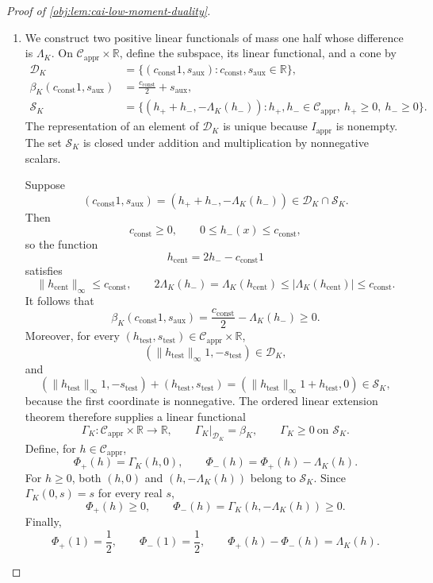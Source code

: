 \begin{proof}[Proof of \cref{obj:lem:cai-low-moment-duality}]
\begin{enumerate}
\item We construct two positive linear functionals of mass one half whose difference is \(\Lambda_K\). On
\(\mathcal C_{\mathrm{appr}}\times\mathbb R\), define the subspace, its linear functional, and a cone by
\[
\begin{aligned}
\mathcal D_K
&=\{(c_{\mathrm{const}}1,s_{\mathrm{aux}}):
       c_{\mathrm{const}},s_{\mathrm{aux}}\in\mathbb R\},\\
\beta_K(c_{\mathrm{const}}1,s_{\mathrm{aux}})
&=\frac{c_{\mathrm{const}}}{2}+s_{\mathrm{aux}},\\
\mathcal S_K
&=\{(h_++h_-,-\Lambda_K(h_-)):
       h_+,h_-\in\mathcal C_{\mathrm{appr}},\
       h_+\ge0,\ h_-\ge0\}.
\end{aligned}
\]
The representation of an element of \(\mathcal D_K\) is unique because
\(I_{\mathrm{appr}}\) is nonempty. The set \(\mathcal S_K\) is closed under addition and multiplication by nonnegative scalars.

Suppose
\[
(c_{\mathrm{const}}1,s_{\mathrm{aux}})
=(h_++h_-,-\Lambda_K(h_-))\in\mathcal D_K\cap\mathcal S_K.
\]
Then
\[
c_{\mathrm{const}}\ge0,\qquad
0\le h_-(x)\le c_{\mathrm{const}},
\]
so the function
\[
h_{\mathrm{cent}}=2h_--c_{\mathrm{const}}1
\]
satisfies
\[
\|h_{\mathrm{cent}}\|_\infty\le c_{\mathrm{const}},\qquad
2\Lambda_K(h_-)
=\Lambda_K(h_{\mathrm{cent}})
\le|\Lambda_K(h_{\mathrm{cent}})|
\le c_{\mathrm{const}}.
\]
It follows that
\[
\beta_K(c_{\mathrm{const}}1,s_{\mathrm{aux}})
=\frac{c_{\mathrm{const}}}{2}-\Lambda_K(h_-)\ge0.
\]
Moreover, for every
\((h_{\mathrm{test}},s_{\mathrm{test}})
\in\mathcal C_{\mathrm{appr}}\times\mathbb R\),
\[
(\|h_{\mathrm{test}}\|_\infty1,-s_{\mathrm{test}})
\in\mathcal D_K,
\]
and
\[
(\|h_{\mathrm{test}}\|_\infty1,-s_{\mathrm{test}})
+(h_{\mathrm{test}},s_{\mathrm{test}})
=(\|h_{\mathrm{test}}\|_\infty1+h_{\mathrm{test}},0)
\in\mathcal S_K,
\]
because the first coordinate is nonnegative. The ordered linear extension theorem therefore supplies a linear functional
\[
\Gamma_K:\mathcal C_{\mathrm{appr}}\times\mathbb R\longrightarrow\mathbb R,
\qquad
\Gamma_K|_{\mathcal D_K}=\beta_K,\qquad
\Gamma_K\ge0\ \text{on }\mathcal S_K.
\]
Define, for \(h\in\mathcal C_{\mathrm{appr}}\),
\[
\Phi_+(h)=\Gamma_K(h,0),\qquad
\Phi_-(h)=\Phi_+(h)-\Lambda_K(h).
\]
For \(h\ge0\), both \((h,0)\) and \((h,-\Lambda_K(h))\) belong to \(\mathcal S_K\). Since \(\Gamma_K(0,s)=s\) for every real \(s\),
\[
\Phi_+(h)\ge0,\qquad
\Phi_-(h)=\Gamma_K(h,-\Lambda_K(h))\ge0.
\]
Finally,
\[
\Phi_+(1)=\frac12,\qquad
\Phi_-(1)=\frac12,\qquad
\Phi_+(h)-\Phi_-(h)=\Lambda_K(h).
\]


\end{enumerate}
\end{proof}
